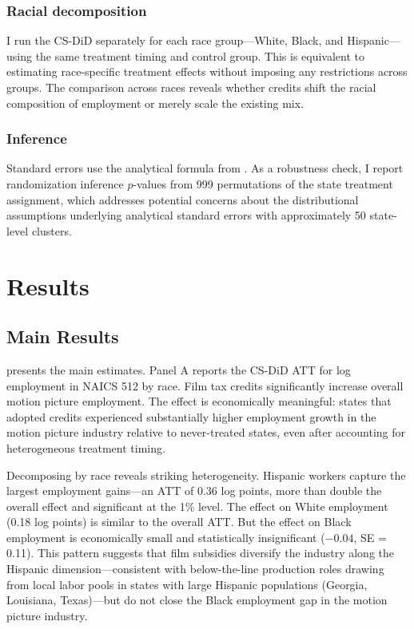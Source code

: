 \documentclass[12pt]{article}
\begin{document}
\subsubsection*{Racial decomposition} I run the CS-DiD separately for each race group---White, Black, and Hispanic---using the same treatment timing and control group. This is equivalent to estimating race-specific treatment effects without imposing any restrictions across groups. The comparison across races reveals whether credits shift the racial composition of employment or merely scale the existing mix.

\subsubsection*{Inference} Standard errors use the analytical formula from \citet{CallawayS2021}. As a robustness check, I report randomization inference $p$-values from 999 permutations of the state treatment assignment, which addresses potential concerns about the distributional assumptions underlying analytical standard errors with approximately 50 state-level clusters.

\section{Results}

\subsection{Main Results}

 presents the main estimates. Panel A reports the CS-DiD ATT for log employment in NAICS 512 by race. Film tax credits significantly increase overall motion picture employment. The effect is economically meaningful: states that adopted credits experienced substantially higher employment growth in the motion picture industry relative to never-treated states, even after accounting for heterogeneous treatment timing.

Decomposing by race reveals striking heterogeneity. Hispanic workers capture the largest employment gains---an ATT of 0.36 log points, more than double the overall effect and significant at the 1\% level. The effect on White employment (0.18 log points) is similar to the overall ATT. But the effect on Black employment is economically small and statistically insignificant ($-0.04$, SE = 0.11). This pattern suggests that film subsidies diversify the industry along the Hispanic dimension---consistent with below-the-line production roles drawing from local labor pools in states with large Hispanic populations (Georgia, Louisiana, Texas)---but do not close the Black employment gap in the motion picture industry.
\end{document}
